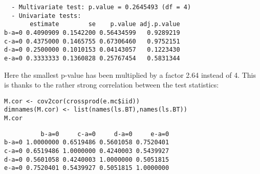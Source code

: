 \documentclass[12pt]{article}
\begin{document}
\begin{verbatim}
  - Multivariate test: p.value = 0.2645493 (df = 4)
  - Univariate tests:
       estimate        se    p.value adj.p.value
b-a=0 0.4090909 0.1542200 0.56434599   0.9289219
c-a=0 0.4375000 0.1465755 0.67306460   0.9752151
d-a=0 0.2500000 0.1010153 0.04143057   0.1223430
e-a=0 0.3333333 0.1360828 0.25767454   0.5831344
\end{verbatim}



Here the smallest p-value has been multiplied by a factor 2.64 instead
of 4. This is thanks to the rather strong correlation between the test
statistics:
\lstset{language=r,label= ,caption= ,captionpos=b,numbers=none}
\begin{lstlisting}
M.cor <- cov2cor(crossprod(e.mc$iid))
dimnames(M.cor) <- list(names(ls.BT),names(ls.BT))
M.cor
\end{lstlisting}

\begin{verbatim}
          b-a=0     c-a=0     d-a=0     e-a=0
b-a=0 1.0000000 0.6519486 0.5601058 0.7520401
c-a=0 0.6519486 1.0000000 0.4240003 0.5439927
d-a=0 0.5601058 0.4240003 1.0000000 0.5051815
e-a=0 0.7520401 0.5439927 0.5051815 1.0000000
\end{verbatim}
\end{document}
